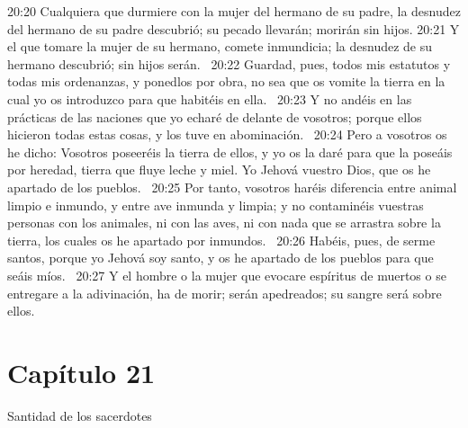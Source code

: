 20:20 Cualquiera que durmiere con la mujer del hermano de su padre, la desnudez del hermano de su padre descubrió; su pecado llevarán; morirán sin hijos. 
20:21 Y el que tomare la mujer de su hermano, comete inmundicia; la desnudez de su hermano descubrió; sin hijos serán.  
20:22 Guardad, pues, todos mis estatutos y todas mis ordenanzas, y ponedlos por obra, no sea que os vomite la tierra en la cual yo os introduzco para que habitéis en ella.  
20:23 Y no andéis en las prácticas de las naciones que yo echaré de delante de vosotros; porque ellos hicieron todas estas cosas, y los tuve en abominación.  
20:24 Pero a vosotros os he dicho: Vosotros poseeréis la tierra de ellos, y yo os la daré para que la poseáis por heredad, tierra que fluye leche y miel. Yo Jehová vuestro Dios, que os he apartado de los pueblos.  
20:25 Por tanto, vosotros haréis diferencia entre animal limpio e inmundo, y entre ave inmunda y limpia; y no contaminéis vuestras personas con los animales, ni con las aves, ni con nada que se arrastra sobre la tierra, los cuales os he apartado por inmundos.  
20:26 Habéis, pues, de serme santos, porque yo Jehová soy santo, y os he apartado de los pueblos para que seáis míos.  
20:27 Y el hombre o la mujer que evocare espíritus de muertos o se entregare a la adivinación, ha de morir; serán apedreados; su sangre será sobre ellos.  
\section*{Capítulo 21 }
Santidad de los sacerdotes  

